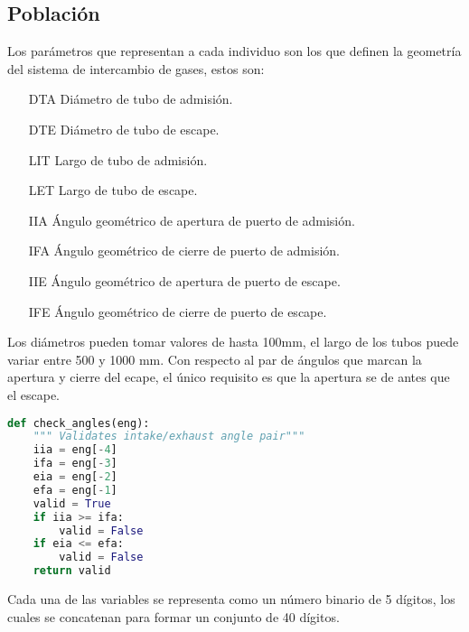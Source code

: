 \subsection{Población}
%
Los parámetros que representan a cada individuo son los que definen la geometría
del sistema de intercambio de gases, estos son:

\begin{enumerate}
    \item [DTA] Diámetro de tubo de admisión.
    \item [DTE] Diámetro de tubo de escape.
    \item [LIT] Largo de tubo de admisión.
    \item [LET] Largo de tubo de escape.
    \item [IIA] Ángulo geométrico de apertura de puerto de admisión.
    \item [IFA] Ángulo geométrico de cierre de puerto de admisión.
    \item [IIE] Ángulo geométrico de apertura de puerto de escape.
    \item [IFE] Ángulo geométrico de cierre de puerto de escape.
\end{enumerate}

Los diámetros pueden tomar valores de hasta 100mm, el largo de los tubos puede
variar entre 500 y 1000 mm.
%
Con respecto al par de ángulos que marcan la apertura y cierre del ecape,
el único requisito es que la apertura se de antes que el escape.

\begin{lstlisting}[language=Python]
def check_angles(eng):
    """ Validates intake/exhaust angle pair"""
    iia = eng[-4]
    ifa = eng[-3]
    eia = eng[-2]
    efa = eng[-1]
    valid = True
    if iia >= ifa:
        valid = False
    if eia <= efa:
        valid = False
    return valid
\end{lstlisting}

Cada una de las variables se representa como un número binario de 5 dígitos,
los cuales se concatenan para formar un conjunto de 40 dígitos.
%

\begin{table}
    \centering
    \caption{Binario a numeros}
    \label{tab:mapeo}
\end{table}

